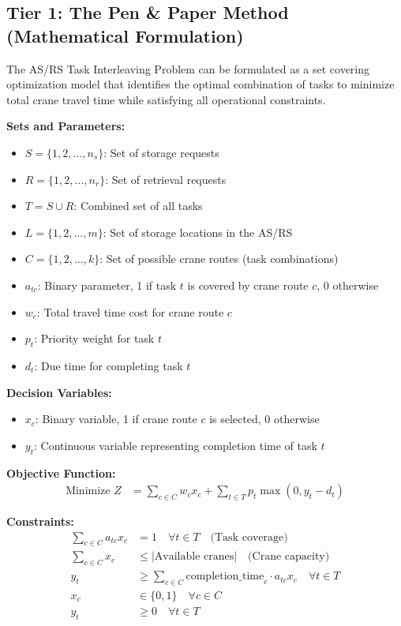 \documentclass{article}
\begin{document}
\subsection{Tier 1: The Pen \& Paper Method (Mathematical Formulation)}

The AS/RS Task Interleaving Problem can be formulated as a set covering optimization model that identifies the optimal combination of tasks to minimize total crane travel time while satisfying all operational constraints.

\textbf{Sets and Parameters:}
\begin{itemize}
\item $S = \{1, 2, \ldots, n_s\}$: Set of storage requests
\item $R = \{1, 2, \ldots, n_r\}$: Set of retrieval requests  
\item $T = S \cup R$: Combined set of all tasks
\item $L = \{1, 2, \ldots, m\}$: Set of storage locations in the AS/RS
\item $C = \{1, 2, \ldots, k\}$: Set of possible crane routes (task combinations)
\item $a_{tc}$: Binary parameter, 1 if task $t$ is covered by crane route $c$, 0 otherwise
\item $w_c$: Total travel time cost for crane route $c$
\item $p_t$: Priority weight for task $t$
\item $d_t$: Due time for completing task $t$
\end{itemize}

\textbf{Decision Variables:}
\begin{itemize}
\item $x_c$: Binary variable, 1 if crane route $c$ is selected, 0 otherwise
\item $y_t$: Continuous variable representing completion time of task $t$
\end{itemize}

\textbf{Objective Function:}
\begin{align}
\text{Minimize } Z &= \sum_{c \in C} w_c x_c + \sum_{t \in T} p_t \max(0, y_t - d_t)
\end{align}

\textbf{Constraints:}
\begin{align}
\sum_{c \in C} a_{tc} x_c &= 1 \quad \forall t \in T \quad \text{(Task coverage)} \\
\sum_{c \in C} x_c &\leq |\text{Available cranes}| \quad \text{(Crane capacity)} \\
y_t &\geq \sum_{c \in C} \text{completion\_time}_c \cdot a_{tc} x_c \quad \forall t \in T \\
x_c &\in \{0, 1\} \quad \forall c \in C \\
y_t &\geq 0 \quad \forall t \in T
\end{align}
\end{document}
